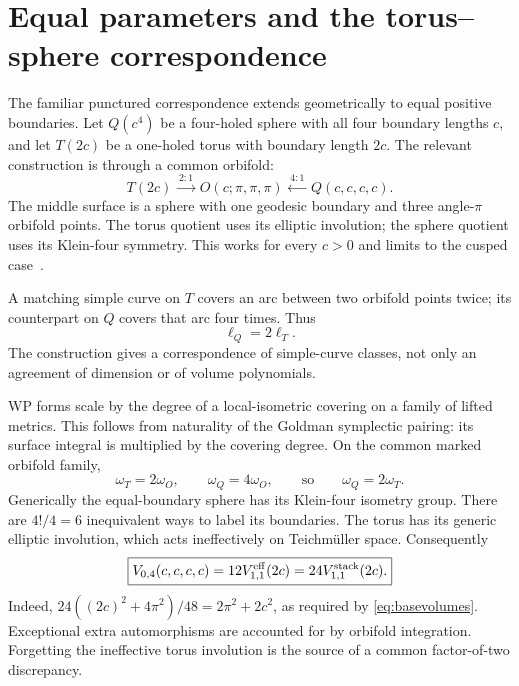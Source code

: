 \documentclass[11pt,a4paper]{article}
\numberwithin{equation}{section}
\theoremstyle{definition}
\theoremstyle{remark}
\begin{document}
\section{Equal parameters and the torus--sphere correspondence}
\label{sec:torussphere}

The familiar punctured correspondence extends geometrically to equal
positive boundaries. Let $Q(c^4)$ be a four-holed sphere with all four
boundary lengths $c$, and let $T(2c)$ be a one-holed torus with boundary
length $2c$. The relevant construction is through a common orbifold:
\begin{equation}
 T(2c)\xrightarrow{\;2:1\;}
 O(c;\pi,\pi,\pi)
 \xleftarrow{\;4:1\;}Q(c,c,c,c).
 \label{eq:commonorbifold}
\end{equation}
The middle surface is a sphere with one geodesic boundary and three
angle-$\pi$ orbifold points. The torus quotient uses its elliptic
involution; the sphere quotient uses its Klein-four symmetry. This works
for every $c>0$ and limits to the cusped case~\cite[Section 3]{HuTan}.

A matching simple curve on $T$ covers an arc between two orbifold points
twice; its counterpart on $Q$ covers that arc four times. Thus
\begin{equation}
 \ell_Q=2\ell_T.
 \label{eq:lengthtorussphere}
\end{equation}
The construction gives a correspondence of simple-curve classes, not only
an agreement of dimension or of volume polynomials.

WP forms scale by the degree of a local-isometric covering on a family of
lifted metrics. This follows from naturality of the Goldman symplectic
pairing: its surface integral is multiplied by the covering degree.
On the common marked orbifold family,
\[
 \omega_T=2\omega_O,\qquad \omega_Q=4\omega_O,
 \qquad\text{so}\qquad\omega_Q=2\omega_T.
\]
Generically the equal-boundary sphere has its Klein-four isometry group.
There are $4!/4=6$ inequivalent ways to label its boundaries. The torus has
its generic elliptic involution, which acts ineffectively on Teichm\"uller
space. Consequently
\begin{equation}
 \boxed{
 V_{0,4}(c,c,c,c)=12V_{1,1}^{\rm eff}(2c)
                =24V_{1,1}^{\rm stack}(2c).}
 \label{eq:voltorussphere}
\end{equation}
Indeed, $24((2c)^2+4\pi^2)/48=2\pi^2+2c^2$, as required by
\eqref{eq:basevolumes}. Exceptional extra automorphisms are accounted for
by orbifold integration. Forgetting the ineffective torus involution is
the source of a common factor-of-two discrepancy.
\end{document}
